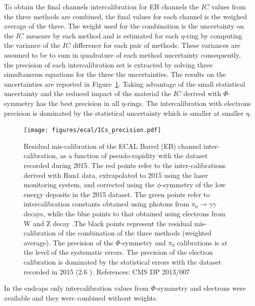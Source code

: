 To obtain the final channels intercalibration for EB channels the $IC$ values from the three methods are combined, the final values
for each channel is the weighed average of the three. The weight used for the combination is the uncertainty on the $IC$
measure by each method and is estimated for each $\eta$-ring by computing the variance of the $IC$ difference for each
pair of methods. These variances are assumed to be to sum in quadrature of each method uncertainty consequently,
the precision of each intercalibration set is extracted by solving three simultaneous equations for the three the uncertainties.
The results on the uncertainties are reported in Figure~\ref{fig:ecal_ic_precision}. Taking advantage of the
small statistical uncertainty and the reduced impact of the material the $IC$ derived with $\Phi$-symmetry has the best precision
in all $\eta$-rings. The intercalibration with electrons precision is dominated by the statistical uncertainty which
is smaller at smaller $\eta$.

\begin{figure}[h!]
  \centering
  \texttt{[image: figures/ecal/ICs\_precision.pdf]}
  \caption{Residual mis-calibration of the ECAL Barrel (EB) channel inter-calibration, as a function of pseudo-rapidity with the dataset recorded during 2015. The red points refer to the inter-calibrations derived with Run1 data, extrapolated to 2015 using the laser monitoring system, and corrected using the $\phi$-symmetry of the low energy deposits in the 2015 dataset. The green points refer to intercalibration constants obtained using photons from $\pi_0\to\gamma\gamma$ decays, while the blue points to that obtained using electrons from W and Z decay .The black points represent the residual mis-calibration of the combination of the three methods (weighted average). The precision of the $\Phi$-symmetry and $\pi_0$ calibrations is at the level of the systematic errors. The precision of the electron calibration is dominated by the statistical errors with the dataset recorded in 2015 (2.6 \fbinv). References: CMS DP 2013/007}
  \label{fig:ecal_ic_precision}
\end{figure}

In the endcaps only intercalibration values from $\Phi$-symmetry and electrons were available and they were combined
without weights.

